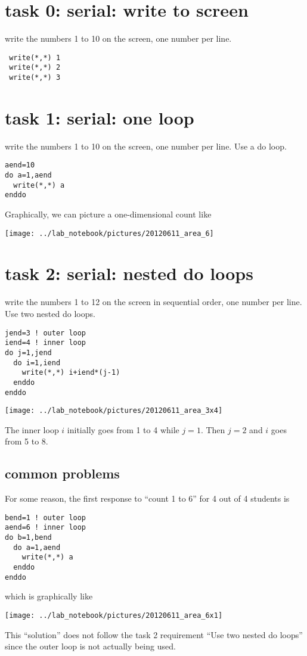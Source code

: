 \documentclass[12pt]{report}
\begin{document}
\addtocounter{section}{-1}

\section{task 0: serial: write to screen}
write the numbers 1 to 10 on the screen, one number per line.
\begin{verbatim}
 write(*,*) 1
 write(*,*) 2
 write(*,*) 3
\end{verbatim}

\section{task 1: serial: one loop}
write the numbers 1 to 10 on the screen, one number per line. Use a do loop.
\begin{verbatim}
aend=10
do a=1,aend
  write(*,*) a
enddo
\end{verbatim}
Graphically, we can picture a one-dimensional count like
\begin{center}
 \texttt{[image: ../lab\_notebook/pictures/20120611\_area\_6]}
\end{center}


\section{task 2: serial: nested do loops}
write the numbers 1 to 12 on the screen in sequential order, one number per line. Use two nested do loops.
\begin{verbatim}
jend=3 ! outer loop
iend=4 ! inner loop
do j=1,jend
  do i=1,iend
    write(*,*) i+iend*(j-1)
  enddo
enddo
\end{verbatim}
\begin{center}
 \texttt{[image: ../lab\_notebook/pictures/20120611\_area\_3x4]}
\end{center}
The inner loop $i$ initially goes from 1 to 4 while $j=1$. Then $j=2$ and $i$ goes from 5 to 8.
\subsection{common problems}
For some reason, the first response to ``count 1 to 6'' for 4 out of 4 students is
\begin{verbatim}
bend=1 ! outer loop
aend=6 ! inner loop
do b=1,bend
  do a=1,aend
    write(*,*) a
  enddo
enddo
\end{verbatim}
which is graphically like 
\begin{center}
 \texttt{[image: ../lab\_notebook/pictures/20120611\_area\_6x1]}
\end{center}
This ``solution'' does not follow the task 2 requirement ``Use two nested do loops'' since the outer loop is not actually being used.
\end{document}
